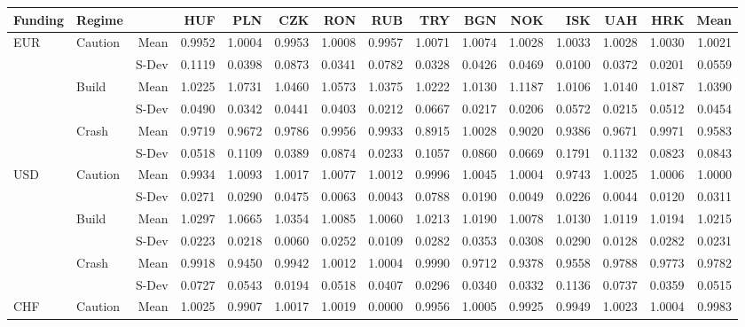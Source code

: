 \documentclass[12pt, a4paper, oneside]{article} %
\begin{document}
\begin{landscape}
\begin{table}[ht]
\centering
\begin{tabular}{llrrrrrrrrrrrrr}
  \hline
 Funding&Regime& & HUF & PLN & CZK & RON & RUB & TRY & BGN & NOK & ISK & UAH & HRK & Mean\\ 
  \hline
\multirow{6}{*}{EUR}&\multirow{2}{*}{Caution}&Mean & 0.9952 & 1.0004 & 0.9953 & 1.0008 & 0.9957 & 1.0071 & 1.0074 & 1.0028 & 1.0033 & 1.0028 & 1.0030 & 1.0021\\ 
  &&S-Dev & 0.1119 & 0.0398 & 0.0873 & 0.0341 & 0.0782 & 0.0328 & 0.0426 & 0.0469 & 0.0100 & 0.0372 & 0.0201 & 0.0559\\ 
  & \multirow{2}{*}{Build} & Mean & 1.0225 & 1.0731 & 1.0460 & 1.0573 & 1.0375 & 1.0222 & 1.0130 & 1.1187 & 1.0106 & 1.0140 & 1.0187 &1.0390 \\
  && S-Dev & 0.0490 & 0.0342 & 0.0441 & 0.0403 & 0.0212 & 0.0667 & 0.0217 & 0.0206 & 0.0572 & 0.0215 & 0.0512 & 0.0454\\ 
  & \multirow{2}{*}{Crash} & Mean & 0.9719 & 0.9672 & 0.9786 & 0.9956 & 0.9933 & 0.8915 & 1.0028 & 0.9020 & 0.9386 & 0.9671 & 0.9971 & 0.9583\\ 
  && S-Dev & 0.0518 & 0.1109 & 0.0389 & 0.0874 & 0.0233 & 0.1057 & 0.0860 & 0.0669 & 0.1791 & 0.1132 & 0.0823 & 0.0843\\ 
\hline
\multirow{6}{*}{USD}& \multirow{2}{*}{Caution} & Mean   & 0.9934 & 1.0093 & 1.0017 & 1.0077 & 1.0012 & 0.9996 & 1.0045 & 1.0004 & 0.9743 & 1.0025 & 1.0006 & 1.0000\\ 
  && S-Dev & 0.0271 & 0.0290 & 0.0475 & 0.0063 & 0.0043 & 0.0788 & 0.0190 & 0.0049 & 0.0226 & 0.0044 & 0.0120 & 0.0311\\ 
  & \multirow{2}{*}{Build} & Mean & 1.0297 & 1.0665 & 1.0354 & 1.0085 & 1.0060 & 1.0213 & 1.0190 & 1.0078 & 1.0130 & 1.0119 & 1.0194 & 1.0215\\ 
  && S-Dev & 0.0223 & 0.0218 & 0.0060 & 0.0252 & 0.0109 & 0.0282 & 0.0353 & 0.0308 & 0.0290 & 0.0128 & 0.0282 & 0.0231 \\ 
  & \multirow{2}{*}{Crash} & Mean & 0.9918 & 0.9450 & 0.9942 & 1.0012 & 1.0004 & 0.9990 & 0.9712 & 0.9378 & 0.9558 & 0.9788 & 0.9773 & 0.9782\\ 
  && S-Dev & 0.0727 & 0.0543 & 0.0194 & 0.0518 & 0.0407 & 0.0296 & 0.0340 & 0.0332 & 0.1136 & 0.0737 & 0.0359 & 0.0515\\ 
\hline
\multirow{6}{*}{CHF}& \multirow{2}{*}{Caution} & Mean& 1.0025 & 0.9907 & 1.0017 & 1.0019 & 0.0000 & 0.9956 & 1.0005 & 0.9925 & 0.9949 & 1.0023 & 1.0004 & 0.9983\\ 

\end{tabular}
\end{table}
\end{landscape}
\end{document}
